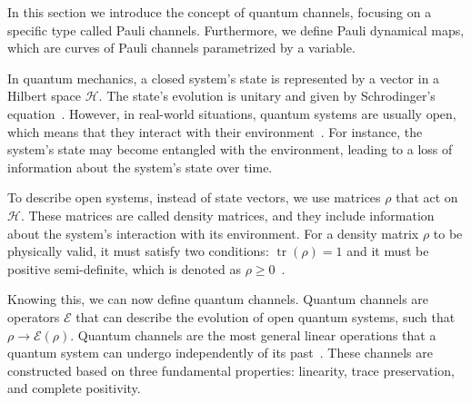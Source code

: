 \documentclass[10pt,letterpaper]{article} %
\DeclareMathOperator{\tr}{tr}
\begin{document}
In this section  we introduce the
concept of quantum channels, focusing on a specific type called Pauli channels.
Furthermore, we define Pauli dynamical maps, which
are curves of Pauli channels parametrized by a variable.



In quantum mechanics, a closed system's state is represented by a vector in a
Hilbert space $\mathcal{H}$.  The state's evolution is unitary and given by
Schrodinger's equation~\cite{Rieffel}.  However, in real-world situations,
quantum systems are usually open, which means that they interact with their
environment~\cite{Breuer}.  For instance, the system's state may become
entangled with the environment, leading to a loss of information about the
system's state over time.

To describe open systems, instead of state vectors,
we use matrices $\rho$ that act on $\mathcal{H}$.
These matrices are called density matrices, and they include information about the system's interaction with its environment. 
For a density matrix $\rho$ to be physically valid, 
it must satisfy two conditions: $\tr(\rho) = 1$ and it must be positive semi-definite,
which is denoted as $\rho \geq 0$~\cite{chuangbook}.


Knowing this, we can now define quantum channels.
Quantum channels are operators $\mathcal{E}$ that
can describe the evolution of open quantum systems, such that $\rho \rightarrow \mathcal{E}(\rho)$.
Quantum channels are the most general linear operations
that a quantum system can undergo independently of its
past~\cite{zimansbook,cirac}.
These channels are constructed based on three fundamental properties: 
linearity, trace preservation, and complete positivity.
\end{document}

